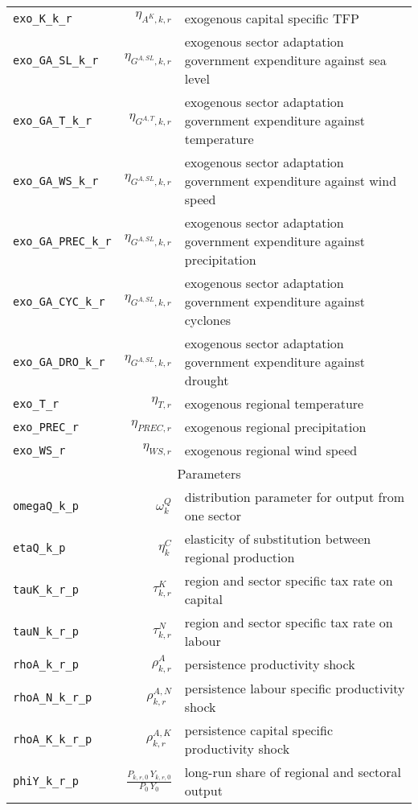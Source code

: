 \begin{center}
\begin{longtable}{lrl}
\texttt{exo\_K\_k\_r} & ${\eta_{A^{K},k,r}}$ & exogenous capital specific TFP\\
\texttt{exo\_GA\_SL\_k\_r} & ${\eta_{G^{A,SL},k,r}}$ & exogenous sector adaptation government expenditure against sea level\\
\texttt{exo\_GA\_T\_k\_r} & ${\eta_{G^{A,T},k,r}}$ & exogenous sector adaptation government expenditure against temperature\\
\texttt{exo\_GA\_WS\_k\_r} & ${\eta_{G^{A,SL},k,r}}$ & exogenous sector adaptation government expenditure against wind speed\\
\texttt{exo\_GA\_PREC\_k\_r} & ${\eta_{G^{A,SL},k,r}}$ & exogenous sector adaptation government expenditure against precipitation\\
\texttt{exo\_GA\_CYC\_k\_r} & ${\eta_{G^{A,SL},k,r}}$ & exogenous sector adaptation government expenditure against cyclones\\
\texttt{exo\_GA\_DRO\_k\_r} & ${\eta_{G^{A,SL},k,r}}$ & exogenous sector adaptation government expenditure against drought\\
\texttt{exo\_T\_r} & ${\eta_{T,r}}$ & exogenous regional temperature\\
\texttt{exo\_PREC\_r} & ${\eta_{PREC,r}}$ & exogenous regional precipitation\\
\texttt{exo\_WS\_r} & ${\eta_{WS,r}}$ & exogenous regional wind speed\\
\hline%
\multicolumn{3}{c}{Parameters}\\%
\hline%
\texttt{omegaQ\_k\_p} & ${\omega^{Q}_{k}}$ & distribution parameter for output from one sector\\
\texttt{etaQ\_k\_p} & ${\eta^{C}_{k}}$ & elasticity of substitution between regional production\\
\texttt{tauK\_k\_r\_p} & ${\tau^{K}_{k,r}}$ & region and sector specific tax rate on capital\\
\texttt{tauN\_k\_r\_p} & ${\tau^{N}_{k,r}}$ & region and sector specific tax rate on labour\\
\texttt{rhoA\_k\_r\_p} & ${\rho^{A}_{k,r}}$ & persistence productivity shock\\
\texttt{rhoA\_N\_k\_r\_p} & ${\rho^{A,N}_{k,r}}$ & persistence labour specific productivity shock\\
\texttt{rhoA\_K\_k\_r\_p} & ${\rho^{A,K}_{k,r}}$ & persistence capital specific productivity shock\\
\texttt{phiY\_k\_r\_p} & $\frac{P_{k,r,0} \, Y_{k,r,0}}{P_{0} \, Y_{0}}$ & long-run share of regional and sectoral output\\

\end{longtable}
\end{center}
